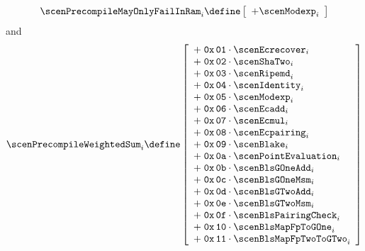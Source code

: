 \[
	\scenPrecompileMayOnlyFailInRam _{i}
	\define
	\left[ \begin{array}{l}
		+ \scenModexp             _{i} \\
	\end{array} \right]
\]
and
\[
	\scenPrecompileWeightedSum _{i}
	\define
	\left[ \begin{array}{l}
		+ \; \mathtt{0x\,01} \cdot \scenEcrecover         _{i} \\
		+ \; \mathtt{0x\,02} \cdot \scenShaTwo            _{i} \\
		+ \; \mathtt{0x\,03} \cdot \scenRipemd            _{i} \\
		+ \; \mathtt{0x\,04} \cdot \scenIdentity          _{i} \\
		+ \; \mathtt{0x\,05} \cdot \scenModexp            _{i} \\
		+ \; \mathtt{0x\,06} \cdot \scenEcadd             _{i} \\
		+ \; \mathtt{0x\,07} \cdot \scenEcmul             _{i} \\
		+ \; \mathtt{0x\,08} \cdot \scenEcpairing         _{i} \\
		+ \; \mathtt{0x\,09} \cdot \scenBlake             _{i} \\
		+ \; \mathtt{0x\,0a} \cdot \scenPointEvaluation   _{i} \\
		+ \; \mathtt{0x\,0b} \cdot \scenBlsGOneAdd        _{i} \\
		+ \; \mathtt{0x\,0c} \cdot \scenBlsGOneMsm        _{i} \\
		+ \; \mathtt{0x\,0d} \cdot \scenBlsGTwoAdd        _{i} \\
		+ \; \mathtt{0x\,0e} \cdot \scenBlsGTwoMsm        _{i} \\
		+ \; \mathtt{0x\,0f} \cdot \scenBlsPairingCheck   _{i} \\
		+ \; \mathtt{0x\,10} \cdot \scenBlsMapFpToGOne    _{i} \\
		+ \; \mathtt{0x\,11} \cdot \scenBlsMapFpTwoToGTwo _{i} \\
	\end{array} \right]
\]
